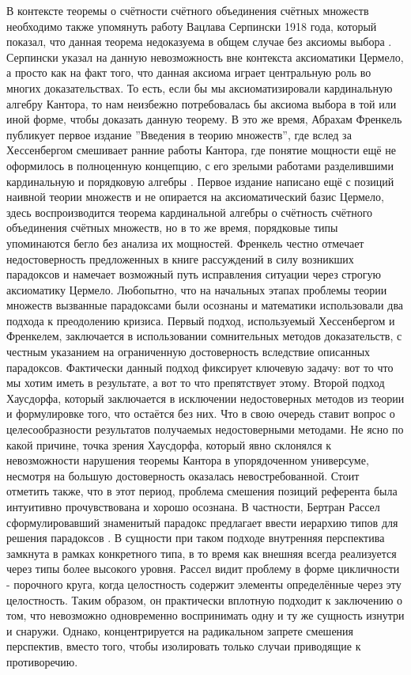 \documentclass[12pt]{article}
\begin{document}
В контексте теоремы о счётности счётного объединения счётных множеств необходимо также упомянуть работу Вацлава Серпински 1918 года, который показал, что данная теорема недоказуема в общем случае без аксиомы выбора \cite{serpinski-choice-axiom}. Серпински указал на данную невозможность вне контекста аксиоматики Цермело, а просто как на факт того, что данная аксиома играет центральную роль во многих доказательствах. То есть, если бы мы аксиоматизировали кардинальную алгебру Кантора, то нам неизбежно потребовалась бы аксиома выбора в той или иной форме, чтобы доказать данную теорему. В это же время, Абрахам Френкель публикует первое издание ''Введения в теорию множеств'', где вслед за Хессенбергом смешивает ранние работы Кантора, где понятие мощности ещё не оформилось в полноценную концепцию, с его зрелыми работами разделившими кардинальную и порядковую алгебры \cite{fraenkel-introduction-1919}. Первое издание написано ещё с позиций наивной теории множеств и не опирается на аксиоматический базис Цермело, здесь воспроизводится теорема кардинальной алгебры о счётность счётного объединения счётных множеств, но в то же время, порядковые типы упоминаются бегло без анализа их мощностей. Френкель честно отмечает недостоверность предложенных в книге рассуждений в силу возникших парадоксов и намечает возможный путь исправления ситуации через строгую аксиоматику Цермело. Любопытно, что на начальных этапах проблемы теории множеств вызванные парадоксами были осознаны и математики использовали два подхода к преодолению кризиса. Первый подход, используемый Хессенбергом и Френкелем, заключается в использовании сомнительных методов доказательств, с честным указанием на ограниченную достоверность вследствие описанных парадоксов. Фактически данный подход фиксирует ключевую задачу: вот то что мы хотим иметь в результате, а вот то что препятствует этому. Второй подход Хаусдорфа, который заключается в исключении недостоверных методов из теории и формулировке того, что остаётся без них. Что в свою очередь ставит вопрос о целесообразности результатов получаемых недостоверными методами. Не ясно по какой причине, точка зрения Хаусдорфа, который явно склонялся к невозможности нарушения теоремы Кантора в упорядоченном универсуме, несмотря на большую достоверность оказалась невостребованной. Стоит отметить также, что в этот период, проблема смешения позиций референта была интуитивно прочувствована и хорошо осознана. В частности, Бертран Рассел сформулировавший знаменитый парадокс предлагает ввести иерархию типов для решения парадоксов \cite{russel-type-theory}. В сущности при таком подходе внутренняя перспектива замкнута в рамках конкретного типа, в то время как внешняя всегда реализуется через типы более высокого уровня. Рассел видит проблему в форме цикличности - порочного круга, когда целостность содержит элементы определённые через эту целостность. Таким образом, он практически вплотную подходит к заключению о том, что невозможно одновременно воспринимать одну и ту же сущность изнутри и снаружи. Однако, концентрируется на радикальном запрете смешения перспектив, вместо того, чтобы изолировать только случаи приводящие к противоречию.
\end{document}
